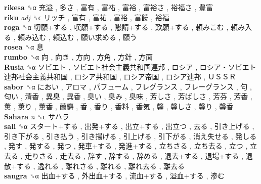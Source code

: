 \textbf{rikesa} ␝α   充溢 ,  多さ ,  富有 ,  富祐 ,  富裕 ,  富裕さ ,  裕福さ ,  豊富   \\
\textbf{riku} \emph{adj}  ␝ϲ   リッチ ,  富有 ,  富祐 ,  富裕 ,  富饒 ,  裕福   \\
\textbf{roga} ␝α   切願+する ,  嘆願+する ,  懇請+する ,  歎願+する ,  頼みこむ ,  頼み入る ,  頼み込む ,  頼込む ,  願い求める ,  願う   \\
\textbf{rosea} ␝α   息   \\
\textbf{rumbo} ␝α   向 ,  向き ,  方向 ,  方角 ,  方針 ,  方面   \\
\textbf{Rusia} ␝α   ソビエト ,  ソビエト社会主義共和国連邦 ,  ロシア ,  ロシア・ソビエト連邦社会主義共和国 ,  ロシア共和国 ,  ロシア帝国 ,  ロシア連邦 ,  ＵＳＳＲ   \\
\textbf{sabor} ␝α   におい ,  アロマ ,  パフューム ,  フレグランス ,  フレーグランス ,  匂 ,  匂い ,  清香 ,  異臭 ,  異香 ,  臭い ,  臭み ,  臭味 ,  芳しさ ,  芳ばしさ ,  芳芬 ,  芳香 ,  薫 ,  薫り ,  薫香 ,  蘭麝 ,  香 ,  香り ,  香料 ,  香気 ,  馨 ,  馨しさ ,  馨り ,  馨香   \\
\textbf{Sahara} \emph{n}  ␝ϲ   サハラ   \\
\textbf{sali} ␝α   スタート+する ,  出発+する ,  出立+する ,  出立つ ,  去る ,  引き上げる ,  引き下がる ,  引き払う ,  引き揚げる ,  引上げる ,  引下がる ,  消え失せる ,  発しる ,  発す ,  発する ,  発つ ,  発車+する ,  発進+する ,  立ちさる ,  立ち去る ,  立つ ,  立去る ,  走りさる ,  走去る ,  辞す ,  辞する ,  辞める ,  退去+する ,  退場+する ,  退散+する ,  逸れる ,  離れさる ,  離れる ,  離れ去る ,  離去る   \\
\textbf{sangra} ␝α   出血+する ,  外出血+する ,  流血+する ,  溢血+する ,  滲む   \\
